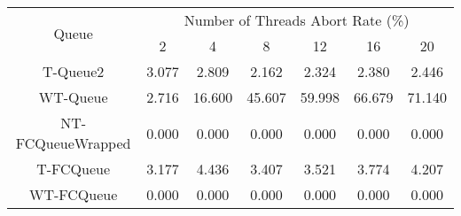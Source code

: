 \begin{tabular}{|c|c|c|c|c|c|c|}
\hline
\multirow{2}{*}{Queue} & \multicolumn{6}{c|}{Number of Threads Abort Rate (\%)}\\\cline{2-7}& 2 & 4 & 8 & 12 & 16 & 20\\
\hline
\hline
T-Queue2 & 3.077 & 2.809 & 2.162 & 2.324 & 2.380 & 2.446\\
WT-Queue & 2.716 & 16.600 & 45.607 & 59.998 & 66.679 & 71.140\\
NT-FCQueueWrapped & 0.000 & 0.000 & 0.000 & 0.000 & 0.000 & 0.000\\
T-FCQueue & 3.177 & 4.436 & 3.407 & 3.521 & 3.774 & 4.207\\
WT-FCQueue & 0.000 & 0.000 & 0.000 & 0.000 & 0.000 & 0.000\\
\hline\end{tabular}
